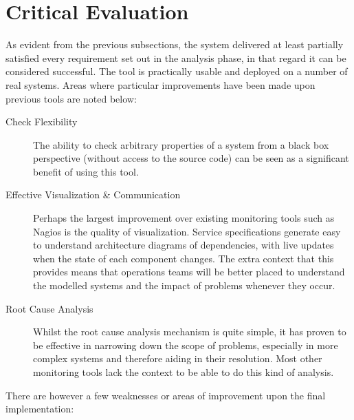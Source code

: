 \documentclass{cshonours}
\begin{document}
\section{Critical Evaluation}

As evident from the previous subsections, the system delivered at least partially satisfied every requirement set out in the analysis phase, in that regard it can be considered successful. The tool is practically usable and deployed on a number of real systems. Areas where particular improvements have been made upon previous tools are noted below:

\begin{description}
  \item[Check Flexibility] The ability to check arbitrary properties of a system from a black box perspective (without access to the source code) can be seen as a significant benefit of using this tool.
  \item[Effective Visualization \& Communication] Perhaps the largest improvement over existing monitoring tools such as Nagios is the quality of visualization. Service specifications generate easy to understand architecture diagrams of dependencies, with live updates when the state of each component changes. The extra context that this provides means that operations teams will be better placed to understand the modelled systems and the impact of problems whenever they occur.
  \item[Root Cause Analysis] Whilst the root cause analysis mechanism is quite simple, it has proven to be effective in narrowing down the scope of problems, especially in more complex systems and therefore aiding in their resolution. Most other monitoring tools lack the context to be able to do this kind of analysis.
\end{description}

There are however a few weaknesses or areas of improvement upon the final implementation:
\end{document}
